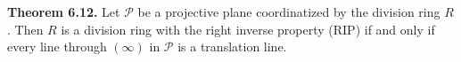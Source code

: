 \textbf{Theorem 6.12.} Let $\mathcal{P}$ be a projective plane coordinatized by the division ring $R$. Then $R$ is a division ring with the right inverse property (RIP) if and only if every line through $(\infty)$ in $\mathcal{P}$ is a translation line.
